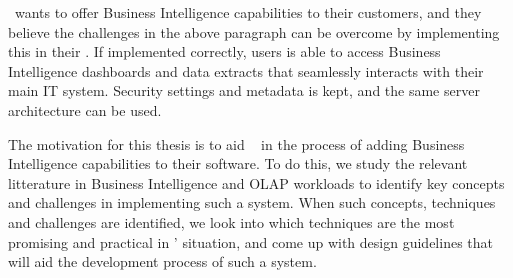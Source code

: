 \genus~wants to offer Business Intelligence capabilities to their customers, and they believe the challenges in the above paragraph can be overcome by implementing this in their \genusSoftware. If implemented correctly, users is able to access Business Intelligence dashboards and data extracts that seamlessly interacts with their main IT system. Security settings and metadata is kept, and the same server architecture can be used.

The motivation for this thesis is to aid \genus~ in the process of adding Business Intelligence capabilities to their software. To do this, we study the relevant litterature in Business Intelligence and OLAP workloads to identify key concepts and challenges in implementing such a system. When such concepts, techniques and challenges are identified, we look into which techniques are the most promising and practical in \genus' situation, and come up with design guidelines that will aid the development process of such a system.


